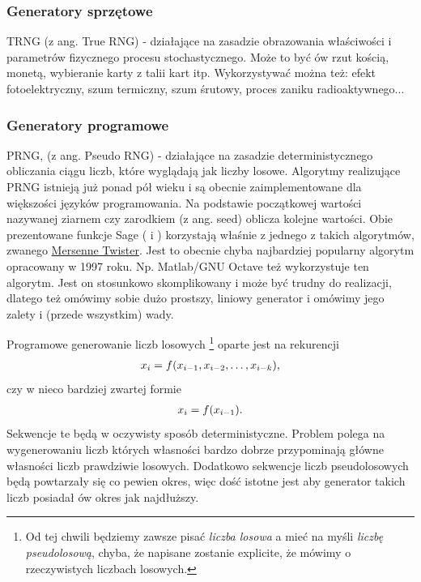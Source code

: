 \documentclass[a4paper,12pt,polish]{sphinxmanual}
\begin{document}
\subsubsection{Generatory sprzętowe}
\label{ch5/chV011:generatory-sprzetowe}
TRNG (z ang. True RNG) - działające na zasadzie obrazowania właściwości i parametrów fizycznego procesu
stochastycznego. Może to być ów rzut kością, monetą, wybieranie karty z talii kart itp. Wykorzystywać
można też: efekt fotoelektryczny, szum termiczny, szum śrutowy, proces zaniku radioaktywnego...


\subsubsection{Generatory programowe}
\label{ch5/chV011:generatory-programowe}
PRNG, (z ang. Pseudo RNG) - działające na zasadzie deterministycznego obliczania ciągu liczb, które
wyglądają jak liczby losowe. Algorytmy realizujące PRNG istnieją już ponad pół wieku i są obecnie
zaimplementowane dla większości języków programowania. Na podstawie początkowej wartości nazywanej
ziarnem czy zarodkiem (z ang. seed) oblicza kolejne wartości.
Obie prezentowane funkcje Sage ( i ) korzystają właśnie z jednego z takich
algorytmów, zwanego \href{http://pl.wikipedia.org/wiki/Mersenne\_Twister}{Mersenne Twister}. Jest to
obecnie chyba najbardziej popularny algorytm opracowany w 1997 roku. Np. Matlab/GNU Octave
też wykorzystuje ten algorytm. Jest on stosunkowo skomplikowany i może być trudny do realizacji,
dlatego też omówimy sobie dużo prostszy, liniowy generator i omówimy jego zalety i (przede wszystkim)
wady.

Programowe generowanie liczb losowych \footnote{
Od tej chwili będziemy zawsze pisać \emph{liczba losowa} a mieć na myśli \emph{liczbę pseudolosową},
chyba, że napisane zostanie explicite, że mówimy o rzeczywistych liczbach losowych.
} oparte jest na rekurencji
\begin{gather}
\begin{split}x_i = f(x_{i-1}, x_{i-2}, \dots, x_{i-k}),\end{split}\notag
\end{gather}
czy w nieco bardziej zwartej formie
\begin{gather}
\begin{split}x_i = f(x_{i-1}).\end{split}\notag
\end{gather}
Sekwencje te będą w oczywisty sposób deterministyczne. Problem polega na wygenerowaniu liczb których
własności bardzo dobrze przypominają główne własności liczb prawdziwie losowych. Dodatkowo sekwencje liczb
pseudolosowych będą powtarzały się co pewien okres, więc dość istotne jest aby generator takich liczb
posiadał ów okres jak najdłuższy.
\end{document}
